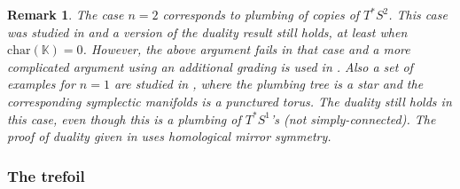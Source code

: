 \documentclass{gtpart}
\newtheorem{rem}[thm]{Remark}
\begin{document}
\begin{rem}
	The case $n=2$ corresponds to plumbing of copies of $T^*S^2$. This case was studied in \cite{EtLe} and a
    version of the duality result still holds, at least when $\mathrm{char}(\mathbb{K}) =0$.
    However, the above argument fails in that case and a more complicated argument using an additional
    grading is used in \cite{EtLe}. Also a set of examples for $n=1$ are studied 
    in \cite{LePol}, where the plumbing tree is a star and the corresponding
    symplectic manifolds is a punctured torus. The duality still holds in this case, even though
    this is a plumbing of $T^*S^1$'s (not simply-connected). The proof of duality given in \cite{LePol} uses homological mirror symmetry. 
\end{rem}

\subsubsection{The trefoil} 
\end{document}
